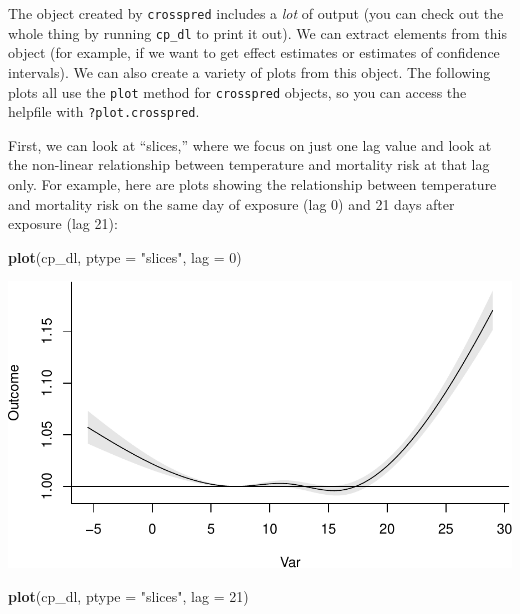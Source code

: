 \documentclass[
]{book}
\newenvironment{Shaded}{\begin{snugshade}}{\end{snugshade}}
\newcommand{\DataTypeTok}[1]{\textcolor[rgb]{0.13,0.29,0.53}{#1}}
\newcommand{\DecValTok}[1]{\textcolor[rgb]{0.00,0.00,0.81}{#1}}
\newcommand{\KeywordTok}[1]{\textcolor[rgb]{0.13,0.29,0.53}{\textbf{#1}}}
\newcommand{\NormalTok}[1]{#1}
\newcommand{\StringTok}[1]{\textcolor[rgb]{0.31,0.60,0.02}{#1}}
\begin{document}
The object created by \texttt{crosspred} includes a \emph{lot} of output (you can check out the
whole thing by running \texttt{cp\_dl} to print it out). We can extract elements from this object
(for example, if we want to get effect estimates or estimates of confidence intervals).
We can also create a variety of plots from this object. The following plots all use the
\texttt{plot} method for \texttt{crosspred} objects, so you can access the helpfile with \texttt{?plot.crosspred}.

First, we can look at ``slices,'' where we focus on just one lag value and look at the non-linear relationship between temperature and mortality risk at that lag only. For example, here are plots showing the relationship between temperature and mortality risk on the same day of exposure (lag 0) and 21 days after exposure (lag 21):

\begin{Shaded}
\begin{Highlighting}[]
\KeywordTok{plot}\NormalTok{(cp_dl, }\DataTypeTok{ptype =} \StringTok{"slices"}\NormalTok{, }\DataTypeTok{lag =} \DecValTok{0}\NormalTok{)}
\end{Highlighting}
\end{Shaded}

\includegraphics{adv_epi_analysis_files/figure-latex/unnamed-chunk-105-1.pdf}

\begin{Shaded}
\begin{Highlighting}[]
\KeywordTok{plot}\NormalTok{(cp_dl, }\DataTypeTok{ptype =} \StringTok{"slices"}\NormalTok{, }\DataTypeTok{lag =} \DecValTok{21}\NormalTok{)}
\end{Highlighting}
\end{Shaded}
\end{document}
